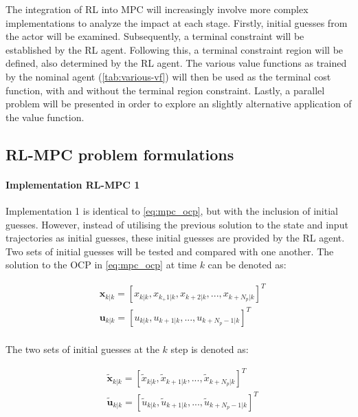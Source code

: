 The integration of RL into MPC will increasingly involve more complex implementations to analyze the impact at each stage. Firstly, initial guesses from the actor will be examined. Subsequently, a terminal constraint will be established by the RL agent. Following this, a terminal constraint region will be defined, also determined by the RL agent. The various value functions as trained by the nominal agent (\autoref{tab:various-vf}) will then be used as the terminal cost function, with and without the terminal region constraint. Lastly, a parallel problem will be presented in order to explore an slightly alternative application of the value function.

\subsection{RL-MPC problem formulations}

\paragraph{Implementation RL-MPC 1}
Implementation 1 is identical to \autoref{eq:mpc_ocp}, but with the inclusion of initial guesses. However, instead of utilising the previous solution to the state and input trajectories as initial guesses, these initial guesses are provided by the RL agent. Two sets of initial guesses will be tested and compared with one another. The solution to the OCP in \autoref{eq:mpc_ocp} at time $k$  can be denoted as:

\begin{equation}\label{eq:sol-mpc-ocp}
	\begin{aligned}
		&\mathbf{x}_{k|k} = [x_{k|k},x_{k_+ 1|k},x_{k + 2|k}, ...,x_{k + N_p|k}]^T \\ 
		&\mathbf{u}_{k|k} = [u_{k|k},u_{k + 1|k}, ...,u_{k + N_p-1|k}]^T \\
	\end{aligned}
\end{equation}

The two sets of initial guesses at the $k$ step is denoted as:

\begin{equation}\label{eq:initial-guess-1}
	\begin{aligned}
		&\tilde{\mathbf{x}}_{k|k} = [\tilde{x}_{k|k},\tilde{x}_{k+1|k},...,\tilde{x}_{k + N_p|k}]^T \\ 
		&\tilde{\mathbf{u}}_{k|k} = [\tilde{u}_{k|k},\tilde{u}_{k + 1|k},...,\tilde{u}_{k + N_p - 1|k}]^T\\ 
	\end{aligned}
\end{equation}

